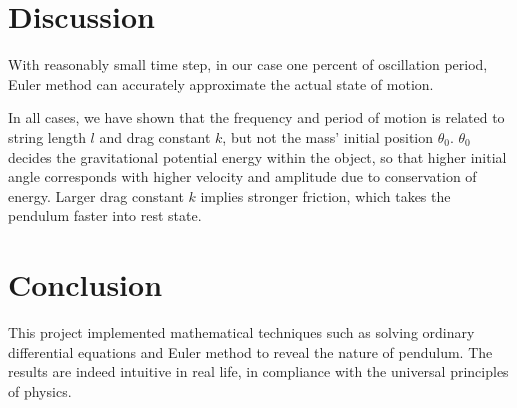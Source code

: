 \documentclass{article}
\begin{document}
\section{Discussion}
\quad With reasonably small time step, in our case one percent of oscillation period, Euler method can accurately approximate the actual state of motion.

In all cases, we have shown that the frequency and period of motion is related to string length $l$ and drag constant $k$, but not the mass' initial position $\theta_0$. $\theta_0$ decides the gravitational potential energy within the object, so that higher initial angle corresponds with higher velocity and amplitude due to conservation of energy. Larger drag constant $k$ implies stronger friction, which takes the pendulum faster into rest state.


\section{Conclusion}
\quad This project implemented mathematical techniques such as solving ordinary differential equations and Euler method to reveal the nature of pendulum. The results are indeed intuitive in real life, in compliance with the universal principles of physics.

\printbibliography
\end{document}
